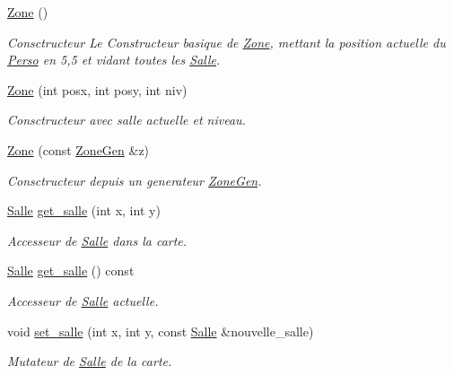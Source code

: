 \begin{DoxyCompactItemize}
\item 
\hyperlink{classZone_a37c9721c0d592a7a231f4e6dbae93277}{Zone} ()
\begin{DoxyCompactList}\small\item\em Consctructeur Le Constructeur basique de \hyperlink{classZone}{Zone}, mettant la position actuelle du \hyperlink{classPerso}{Perso} en 5,5 et vidant toutes les \hyperlink{classSalle}{Salle}. \end{DoxyCompactList}\item 
\hyperlink{classZone_a47c33a8aad7a0c17ff8ab213aad492f7}{Zone} (int posx, int posy, int niv)
\begin{DoxyCompactList}\small\item\em Consctructeur avec salle actuelle et niveau. \end{DoxyCompactList}\item 
\hyperlink{classZone_afddea0858e93cf8050e6263347b6864f}{Zone} (const \hyperlink{classZoneGen}{Zone\+Gen} \&z)
\begin{DoxyCompactList}\small\item\em Consctructeur depuis un generateur \hyperlink{classZoneGen}{Zone\+Gen}. \end{DoxyCompactList}\item 
\hyperlink{classSalle}{Salle} \hyperlink{classZone_a6b28456d584e884cdeceaf6d4dcedbd1}{get\+\_\+salle} (int x, int y)
\begin{DoxyCompactList}\small\item\em Accesseur de \hyperlink{classSalle}{Salle} dans la {\itshape carte}. \end{DoxyCompactList}\item 
\hyperlink{classSalle}{Salle} \hyperlink{classZone_a3214726410943fed7c5a44f49e998cee}{get\+\_\+salle} () const 
\begin{DoxyCompactList}\small\item\em Accesseur de \hyperlink{classSalle}{Salle} actuelle. \end{DoxyCompactList}\item 
void \hyperlink{classZone_a5c68a620d5c32cd2bf26272aeaee557d}{set\+\_\+salle} (int x, int y, const \hyperlink{classSalle}{Salle} \&nouvelle\+\_\+salle)
\begin{DoxyCompactList}\small\item\em Mutateur de \hyperlink{classSalle}{Salle} de la {\itshape carte}. \end{DoxyCompactList}\item 

\end{DoxyCompactItemize}
